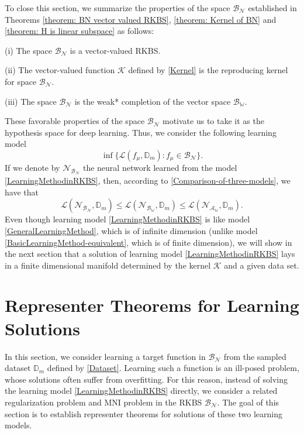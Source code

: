 \documentclass[11pt]{article}
\begin{document}
To close this section, we summarize the properties of the space $\mathcal{B}_{\mathcal{N}}$ established in 
Theorems \ref{theorem: BN vector valued RKBS}, \ref{theorem: Kernel of BN} and \ref{theorem: H is linear subspace} as follows:

(i) The space $\mathcal{B}_{\mathcal{N}}$ is a vector-valued RKBS.

(ii) The vector-valued function $\mathcal{K}$ defined by \eqref{Kernel}
is the reproducing kernel for space $\mathcal{B}_{\mathcal{N}}$.

(iii) The space $\mathcal{B}_{\mathcal{N}}$ is the weak* completion of the vector space $\mathcal{B}_{\mathbb{W}}$.

\noindent
These favorable properties of the space $\mathcal{B}_{\mathcal{N}}$ motivate us to take it as the hypothesis space for deep learning. 
Thus, we consider the following learning model  
\begin{equation}\label{LearningMethodinRKBS}
    \inf\{\mathcal{L}(f_{\mu},\mathbb{D}_m): f_{\mu}\in\mathcal{B}_{\mathcal{N}}\}.
\end{equation}
If we denote by $\mathcal{N}_{\mathcal{B}_\mathcal{N}}$ the neural network learned from the model \eqref{LearningMethodinRKBS}, then, according to \eqref{Comparison-of-three-models}, we have that
\begin{equation*}
    \mathcal{L}(\mathcal{N}_{\mathcal{B}_\mathcal{N}},\mathbb{D}_m)\leq \mathcal{L}(\mathcal{N}_{\mathcal{B}_\mathbb{W}},\mathbb{D}_m)
    \leq \mathcal{L}(\mathcal{N}_{\mathcal{A}_\mathbb{W}},\mathbb{D}_m).
\end{equation*}
Even though learning model \eqref{LearningMethodinRKBS} is like model \eqref{GeneralLearningMethod}, which is of infinite dimension (unlike model \eqref{BasicLearningMethod-equivalent}, which is of finite dimension), we will show in the next section that a solution of learning model \eqref{LearningMethodinRKBS} lays in a finite dimensional manifold determined by the kernel $\mathcal{K}$ and a given data set.


%
%
%
%
 
 

\section{Representer Theorems for Learning Solutions}

In this section, we consider learning a target function in $\mathcal{B}_{\mathcal{N}}$ from the sampled dataset $\mathbb{D}_m$ defined by \eqref{Dataset}. Learning such a function is an ill-posed problem, whose solutions often suffer from overfitting. For this reason, instead of solving the learning model \eqref{LearningMethodinRKBS} directly, we consider a related regularization problem and MNI problem in the RKBS $\mathcal{B}_{\mathcal{N}}$. The goal of this section is to 
establish %
representer theorems for solutions of these two learning models. 
%
\end{document}
